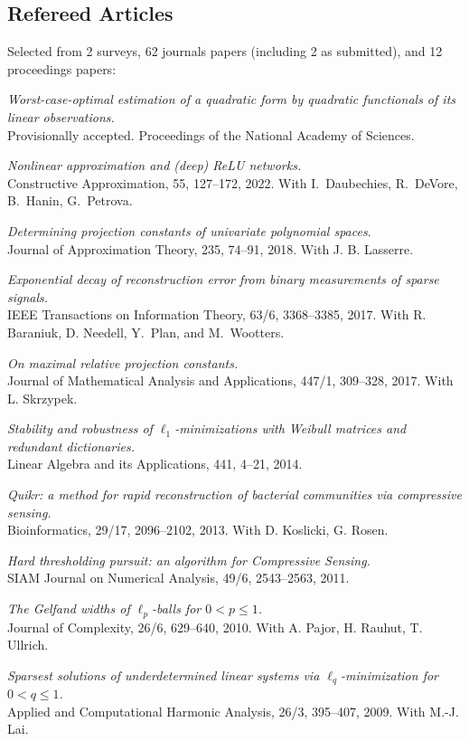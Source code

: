\documentclass[11pt]{article}
\begin{document}
\subsection{Refereed Articles}
Selected from 2 surveys, 62 journals papers (including 2 as submitted), and 12 proceedings papers:
\betaremune
\item {\sl Worst-case-optimal estimation of a quadratic form by quadratic functionals of its linear observations.}\\
Provisionally accepted. Proceedings of the National Academy of Sciences.
\item {\sl Nonlinear approximation and (deep) ReLU networks.}\\
Constructive Approximation,  55, 127--172, 2022.
With I.~Daubechies, R.~DeVore, B.~Hanin, G.~Petrova.
\item {\sl Determining projection constants of univariate polynomial spaces}.\\
Journal of Approximation Theory, 235, 74--91, 2018.
With J. B. Lasserre.
\item {\sl Exponential decay of reconstruction error from binary measurements of sparse signals.}\\
IEEE Transactions on Information Theory, 63/6, 3368--3385, 2017.
With R. Baraniuk, D. Needell, Y.~Plan, and \mbox{M.~Wootters}.
\item {\sl On maximal relative projection constants.}\\
Journal of Mathematical Analysis and Applications,  447/1, 309--328, 2017.
With L. Skrzypek.
\item {\sl Stability and robustness of $\ell_1$-minimizations with Weibull matrices and redundant dictionaries.}\\
Linear Algebra and its Applications, 441, 4--21, 2014.
\item {\sl Quikr: a method for rapid reconstruction of bacterial communities via compressive sensing.}\\
Bioinformatics, 29/17, 2096--2102, 2013. 
With D. Koslicki, G. Rosen.
\item {\sl Hard thresholding pursuit: an algorithm for Compressive Sensing.}\\
SIAM Journal on Numerical Analysis, 49/6, 2543--2563, 2011.
\item {\sl The Gelfand widths of $\ell_p$-balls for $0<p \le 1$.}\\
Journal of Complexity, 26/6, 629--640, 2010. 
With A. Pajor, H. Rauhut, T. Ullrich.
\item {\sl  Sparsest solutions of underdetermined linear systems via $\ell_q$-minimization for $0 <  q  \le  1$.}\\
Applied and Computational Harmonic Analysis, 26/3, 395--407, 2009. 
With M.-J. Lai.
\eetaremune
\end{document}
